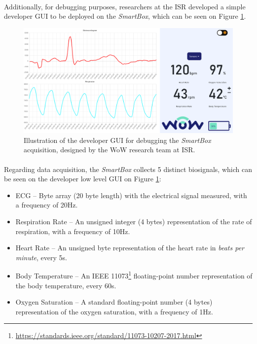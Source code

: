 \paragraph{} Additionally, for debugging purposes, researchers at the \acs{ISR} developed a simple developer \acs{GUI} to be deployed on the \textit{SmartBox}, which can be seen on Figure \ref{fig:smartbox-gui}.

\begin{figure}[H]
    \centering
    \includegraphics[width=\linewidth]{images/smartbox-gui.png}
    \caption{Illustration of the developer \acf{GUI} for debugging the \textit{SmartBox} acquisition, designed by the \acs{WoW} research team at \acs{ISR}.}
    \label{fig:smartbox-gui}
\end{figure}

\paragraph{} Regarding data acquisition, the \textit{SmartBox} collects 5 distinct biosignals, which can be seen on the developer low level \acs{GUI} on Figure \ref{fig:smartbox-gui}:

\label{sec:biosticker_data}

\begin{itemize}
    \item \acf{ECG} -- Byte array (20 byte length) with the electrical signal measured, with a frequency of 20Hz.
    \item Respiration Rate -- An unsigned integer (4 bytes) representation of the rate of respiration, with a frequency of 10Hz.
    \item Heart Rate -- An unsigned byte representation of the heart rate in \textit{beats per minute}, every 5s.
    \item Body Temperature -- An IEEE 11073\footnote{\url{https://standards.ieee.org/standard/11073-10207-2017.html}} floating-point number representation of the body temperature, every 60s.
    \item Oxygen Saturation -- A standard floating-point number (4 bytes) representation of the oxygen saturation, with a frequency of 1Hz.
\end{itemize}

